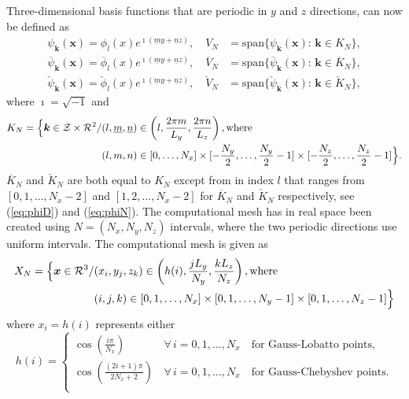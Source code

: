 \documentclass[11pt, oneside]{article}
\newcommand{\N}[1]{\check{#1}}
\newcommand{\D}[1]{\overline{#1}}
\begin{document}
Three-dimensional basis functions that are periodic in $y$ and $z$ directions, can now be defined as
\begin{align}
  \psi_{\bm{k}}(\bm{x}) = \phi_{l}(x)e^{ \imath(\underline{m} y + \underline{n} z)}, \quad V_N &= \text{span} \{ \psi_{\bm{k}}(\bm{x}):\, \bm{k} \in K_N  \}, \\
  \D{\psi}_{\bm{k}}(\bm{x}) = \D{\phi}_{l}(x)e^{ \imath(\underline{m} y + \underline{n} z)}, \quad \D{V}_N &= \text{span} \{ \D{\psi}_{\bm{k}}(\bm{x}):\, \bm{k} \in \D{K}_N  \}, \\
  \N{\psi}_{\bm{k}}(\bm{x}) = \N{\phi}_{l}(x)e^{ \imath(\underline{m} y + \underline{n} z)}, \quad \N{V}_N &= \text{span} \{ \N{\psi}_{\bm{k}}(\bm{x}):\, \bm{k} \in \N{K}_N  \},
\end{align}
where $\imath=\sqrt{-1}$ and 
\begin{align}
K_N = \Big\{\bm{k} \in \mathcal{Z}\times\mathcal{R}^2 / &(l, \underline{m}, \underline{n}) \in \left( l, \frac{2 \pi m}{L_y}, \frac{2 \pi n}{L_z} \right), \text{where} \notag \\
 &(l, m, n) \in  [0, \ldots, N_x] \times [-\frac{N_y}{2},\ldots, \frac{N_y}{2}-1] \times[-\frac{N_z}{2},\ldots, \frac{N_z}{2}-1] \Big\}. \label{eq:wavenumbermesh}
\end{align}
$\D{K}_N$ and $\N{K}_N$ are both equal to $K_N$ except from in index $l$ that ranges from $[0, 1, \ldots, N_x-2]$ and $[1, 2, \ldots, N_x-2]$ for $\D{K}_N$ and $\N{K}_N$ respectively, see (\ref{eq:phiD}) and (\ref{eq:phiN}). The computational mesh has in real space been created using $N = (N_x, N_y, N_z)$ intervals, where the two periodic directions use uniform intervals. The computational mesh is given as
\begin{align}
  X_N = \Big\{ \bm{x} \in \mathcal{R}^3/&(x_i, y_j, z_k) \in \left( h(i), \frac{jL_y}{N_y}, \frac{kL_z}{N_z} \right), \text{where} \notag \\
  &(i, j, k) \in [0, 1, \ldots, N_x] \times [0, 1, \ldots, N_y-1] \times [0, 1, \ldots, N_z-1] \Big\} \label{eq:Xn}
\end{align}
where $x_i = h(i)$ represents either
\begin{equation}
 h(i) = \begin{cases}
   \cos \left(\frac{i \pi }{N_x} \right) \, &\forall \, i=0,1, \ldots, N_x \quad  \text{for Gauss-Lobatto points}, \\
   \cos \left(\frac{(2i +1)\pi}{2N_x+2} \right) \, &\forall \, i=0,1, \ldots, N_x \quad  \text{for Gauss-Chebyshev points}. \\
 \end{cases}
\end{equation}
\end{document}
